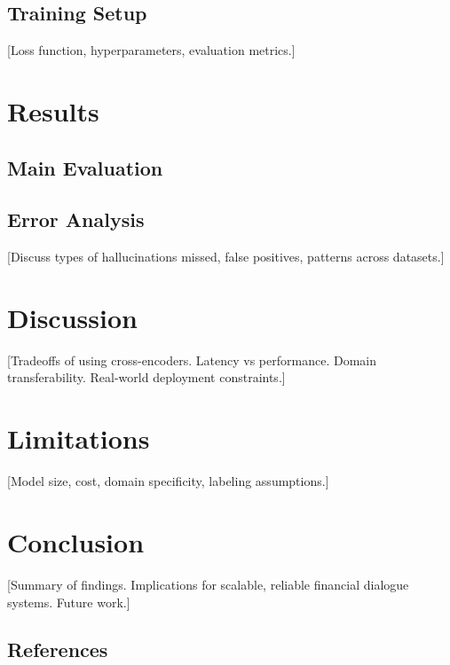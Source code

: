 \documentclass[11pt]{article}
\begin{document}
\subsection{Training Setup}
[Loss function, hyperparameters, evaluation metrics.]

\section{Results}
\subsection{Main Evaluation}


\subsection{Error Analysis}
[Discuss types of hallucinations missed, false positives, patterns across datasets.]


\section{Discussion}
[Tradeoffs of using cross-encoders. Latency vs performance. Domain transferability. Real-world deployment constraints.]

\section{Limitations}
[Model size, cost, domain specificity, labeling assumptions.]

\section{Conclusion}
[Summary of findings. Implications for scalable, reliable financial dialogue systems. Future work.]

\subsection{References}

\nocite{Ando2005,augenstein-etal-2016-stance,andrew2007scalable,rasooli-tetrault-2015,goodman-etal-2016-noise,harper-2014-learning}
\end{document}
